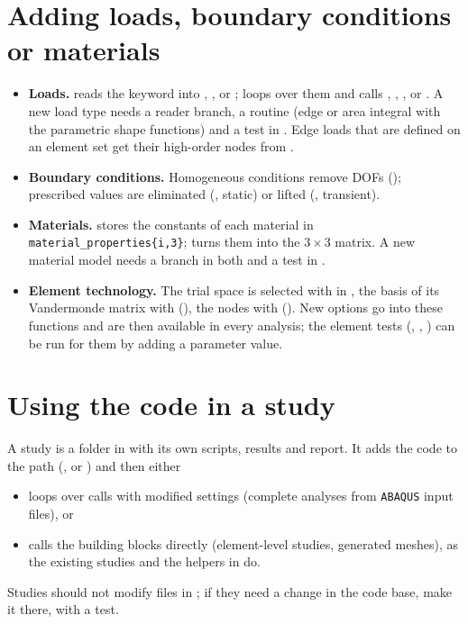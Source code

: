 \section{Adding loads, boundary conditions or materials}

\begin{itemize}
  \item \textbf{Loads.}  reads the keyword into
    , ,  or ;
     loops over them and calls ,
    , ,  or
    . A new load type needs a reader branch, a
     routine (edge or area integral with the parametric shape
    functions) and a test in . Edge loads that are defined on an
    element set get their high-order nodes from .
  \item \textbf{Boundary conditions.} Homogeneous conditions remove DOFs
    (); prescribed values are eliminated
    (, static) or lifted
    (, transient).
  \item \textbf{Materials.}  stores the constants of
    each material in \texttt{material\_properties\{i,3\}}; 
    turns them into the $3\times3$ matrix. A new material model needs a branch in
    both and a test in .
  \item \textbf{Element technology.} The trial space is selected with
     in , the basis of its
    Vandermonde matrix with  (), the
    nodes with  (). New options go into
    these functions and are then available in every analysis; the element tests
    (, ,
    ) can be run for them by adding a parameter value.
\end{itemize}

\section{Using the code in a study}

A study is a folder in  with its own scripts, results and report.
It adds the code to the path (, or
) and then either
\begin{itemize}
  \item loops over  calls with modified settings (complete
    analyses from \texttt{ABAQUS} input files), or
  \item calls the building blocks directly (element-level studies, generated
    meshes), as the existing studies and the helpers in  do.
\end{itemize}
Studies should not modify files in ; if they need a change in the
code base, make it there, with a test.

